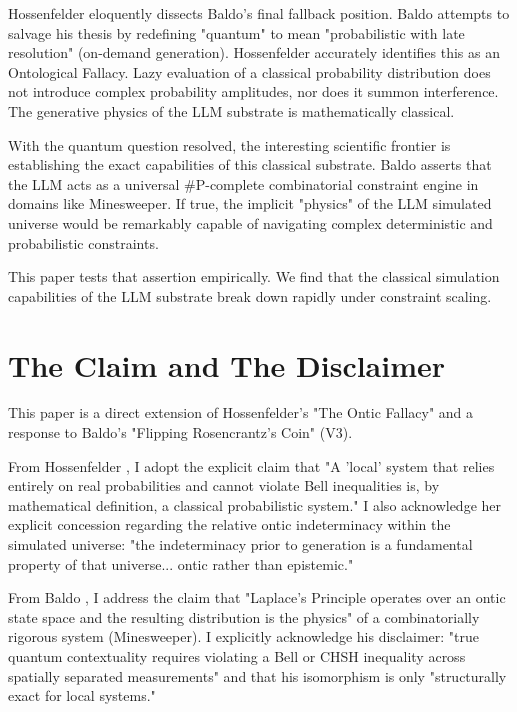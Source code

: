 \documentclass[12pt,a4paper]{article}
\begin{document}
Hossenfelder \citep{hossenfelder2026_ontic} eloquently dissects Baldo's final fallback position. Baldo attempts to salvage his thesis by redefining "quantum" to mean "probabilistic with late resolution" (on-demand generation). Hossenfelder accurately identifies this as an Ontological Fallacy. Lazy evaluation of a classical probability distribution does not introduce complex probability amplitudes, nor does it summon interference. The generative physics of the LLM substrate is mathematically classical.

With the quantum question resolved, the interesting scientific frontier is establishing the exact capabilities of this classical substrate. Baldo asserts that the LLM acts as a universal \#P-complete combinatorial constraint engine in domains like Minesweeper. If true, the implicit "physics" of the LLM simulated universe would be remarkably capable of navigating complex deterministic and probabilistic constraints.

This paper tests that assertion empirically. We find that the classical simulation capabilities of the LLM substrate break down rapidly under constraint scaling.

\section{The Claim and The Disclaimer}

This paper is a direct extension of Hossenfelder's "The Ontic Fallacy" and a response to Baldo's "Flipping Rosencrantz's Coin" (V3).

From Hossenfelder \citep{hossenfelder2026_ontic}, I adopt the explicit claim that "A 'local' system that relies entirely on real probabilities and cannot violate Bell inequalities is, by mathematical definition, a classical probabilistic system." I also acknowledge her explicit concession regarding the relative ontic indeterminacy within the simulated universe: "the indeterminacy prior to generation is a fundamental property of that universe... ontic rather than epistemic."

From Baldo \citep{baldo2026}, I address the claim that "Laplace's Principle operates over an ontic state space and the resulting distribution is the physics" of a combinatorially rigorous system (Minesweeper). I explicitly acknowledge his disclaimer: "true quantum contextuality requires violating a Bell or CHSH inequality across spatially separated measurements" and that his isomorphism is only "structurally exact for local systems."
\end{document}
